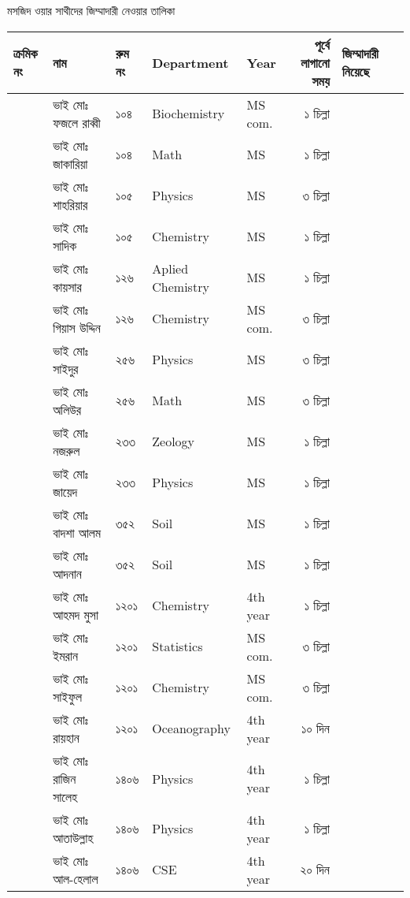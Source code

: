 \documentclass{article}
\newcounter{magicrownumbers}
\newcommand\rownumber{\stepcounter{magicrownumbers}\arabic{magicrownumbers}}
\begin{document}
\begin{center}
মসজিদ ওয়ার সাথীদের জিম্মাদারী নেওয়ার তালিকা
\end{center}
\noindent
\centering
\noindent
  \begin{tabular}{@{}lll
>{\selectlanguage{english}}l
>{\selectlanguage{english}}l
    r|p{4.5cm}r@{}}
\toprule
ক্রমিক নং &  নাম &  রুম নং &  Department & Year & পূর্বে লাগানো সময় & জিম্মাদারী নিয়েছে \\
\toprule
\rownumber & ভাই মোঃ ফজলে রাব্বী  & ১০৪ & Biochemistry & MS com. & ১ চিল্লা \\ 
\hline
\rownumber & ভাই মোঃ জাকারিয়া & ১০৪ & Math & MS & ১ চিল্লা \\
\hline
\rownumber & ভাই মোঃ শাহরিয়ার & ১০৫ & Physics & MS & ৩ চিল্লা \\
\hline
\rownumber & ভাই মোঃ সাদিক & ১০৫ & Chemistry & MS & ১ চিল্লা \\
\hline
\rownumber & ভাই মোঃ কায়সার & ১২৬ & Aplied Chemistry & MS & ১ চিল্লা \\ 
\hline
\rownumber & ভাই মোঃ গিয়াস উদ্দিন  & ১২৬ & Chemistry & MS com. & ৩ চিল্লা \\ 
\hline
\rownumber & ভাই মোঃ সাইদুর & ২৫৬ & Physics & MS & ৩ চিল্লা \\ 
\hline
\rownumber & ভাই মোঃ অলিউর & ২৫৬ & Math & MS & ৩ চিল্লা \\ 
\hline
\rownumber & ভাই মোঃ নজরুল  & ২৩৩ & Zeology & MS & ১ চিল্লা \\ 
\rownumber & ভাই মোঃ জায়েদ & ২৩৩ & Physics & MS & ১ চিল্লা \\ 
\hline
\rownumber & ভাই মোঃ বাদশা আলম & ৩৫২ & Soil & MS & ১ চিল্লা \\
\hline
\rownumber & ভাই মোঃ আদনান & ৩৫২ & Soil & MS & ১ চিল্লা \\
\hline
\rownumber & ভাই মোঃ আহমদ মুসা & ১২০১ & Chemistry & 4th year & ১ চিল্লা \\ 
\hline
\rownumber & ভাই মোঃ ইমরান & ১২০১ & Statistics & MS com. & ৩ চিল্লা \\ 
\hline
\rownumber & ভাই মোঃ সাইফুল & ১২০১ & Chemistry & MS com. & ৩ চিল্লা \\ 
\hline
\rownumber & ভাই মোঃ রায়হান  & ১২০১ & Oceanography & 4th year & ১০ দিন \\
\hline
\rownumber & ভাই মোঃ রাজিন সালেহ & ১৪০৬ & Physics & 4th year & ১ চিল্লা \\ 
\hline
\rownumber & ভাই মোঃ আতাউল্লাহ & ১৪০৬ & Physics & 4th year & ১ চিল্লা \\  
\hline
\rownumber & ভাই মোঃ আল-হেলাল & ১৪০৬ & CSE & 4th year & ২০ দিন \\

\end{tabular}
\end{document}
